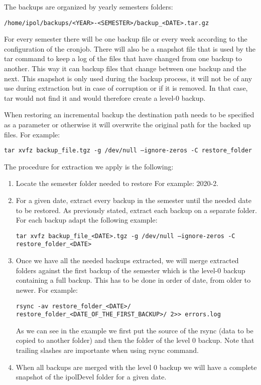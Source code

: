 \documentclass[a4paper,12pt]{article}
\begin{document}
The backups are organized by yearly semesters folders:

{\tt /home/ipol/backups/<YEAR>-<SEMESTER>/backup\_<DATE>.tar.gz}

For every semester there will be one backup file or every week according to the configuration of the cronjob. There will also be a snapshot file that is used by the tar command to keep a log of the files that have changed from one backup to another. This way it can backup files that change between one backup and the next. This snapshot is only used during the backup process, it will not be of any use during extraction but in case of corruption or if it is removed. In that case, tar would not find it and would therefore create a level-0 backup. 

When restoring an incremental backup the destination path needs to be specified as a parameter or otherwise it will overwrite the original path for the backed up files. For example:

{\tt tar xvfz backup\_file.tgz -g /dev/null --ignore-zeros -C restore\_folder}

The procedure for extraction we apply is the following:

\begin{enumerate}
  \item Locate the semester folder needed to restore For example: 2020-2.
  \item For a given date, extract every backup in the semester until the needed date to be restored. As previously stated, extract each backup on a separate folder. For each backup adapt the following example:

  {\tt tar xvfz backup\_file\_<DATE>.tgz -g /dev/null --ignore-zeros -C restore\_folder\_<DATE>}
  \item Once we have all the needed backups extracted, we will merge extracted folders against the first backup of the semester which is the level-0 backup containing a full backup. This has to be done in order of date, from older to newer. For example:
  
  {\tt rsync -av restore\_folder\_<DATE>/ restore\_folder\_<DATE\_OF\_THE\_FIRST\_BACKUP>/ 2>> errors.log}

  As we can see in the example we first put the source of the rsync (data to be copied to another folder) and then the folder of the level 0 backup. Note that trailing slashes are importante when using rsync command.
  \item When all backups are merged with the level 0 backup we will have a complete snapshot of the ipolDevel folder for a given date.
\end{enumerate}
\end{document}
